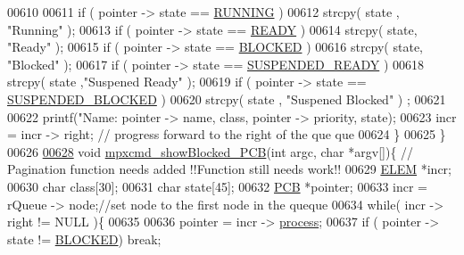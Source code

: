 \begin{DoxyCode}
{{{{00610                 
00611                 \textcolor{keywordflow}{if} ( pointer -> state == \hyperlink{mpx__r2_8h_a6fb7181d994ee98e735494be55809708}{RUNNING} ) 
00612                         strcpy( state , \textcolor{stringliteral}{"Running"} );
00613                 \textcolor{keywordflow}{if} ( pointer -> state == \hyperlink{mpx__r2_8h_ad1235d5ce36f7267285e82dccd428aa6}{READY} ) 
00614                         strcpy( state, \textcolor{stringliteral}{"Ready"} );
00615                 \textcolor{keywordflow}{if} ( pointer -> state == \hyperlink{mpx__r2_8h_a48f6457243719e7031768d4100741159}{BLOCKED} ) 
00616                         strcpy( state, \textcolor{stringliteral}{"Blocked"} );
00617                 \textcolor{keywordflow}{if} ( pointer -> state == \hyperlink{mpx__r2_8h_a07b1141143e8825b04670da23fca8cc7}{SUSPENDED_READY} ) 
00618                         strcpy( state ,\textcolor{stringliteral}{"Suspened Ready"} );
00619                 \textcolor{keywordflow}{if} ( pointer -> state == \hyperlink{mpx__r2_8h_a6e41bb5a80c5049e8d364bab8ee4d73a}{SUSPENDED_BLOCKED} ) 
00620                         strcpy( state , \textcolor{stringliteral}{"Suspened Blocked"} ) ;
00621                 
00622                 printf(\textcolor{stringliteral}{"Name: %
      pointer -> name, \textcolor{keyword}{class}, pointer -> priority, state); 
00623                 incr = incr -> right; \textcolor{comment}{// progress forward to the right of the que
      que}
00624         \}
00625 \}
00626 
\hypertarget{mpx__r2_8c_source_l00628}{}\hyperlink{mpx__r2_8h_ae1ef92a5e3a8869ec269a23b3b854c9b}{00628} \textcolor{keywordtype}{void} \hyperlink{mpx__r2_8c_ae1ef92a5e3a8869ec269a23b3b854c9b}{mpxcmd_showBlocked_PCB}(\textcolor{keywordtype}{int} argc, \textcolor{keywordtype}{char} *argv[])\{ \textcolor{comment}{// Pagination function needs
       added !!Function still needs work!!}
00629         \hyperlink{structpage}{ELEM} *incr;
00630         \textcolor{keywordtype}{char} \textcolor{keyword}{class}[30];
00631         \textcolor{keywordtype}{char} state[45];
00632         \hyperlink{structprocess}{PCB} *pointer;
00633         incr = rQueue -> node;\textcolor{comment}{//set node to the first node in the queque}
00634         \textcolor{keywordflow}{while}( incr -> right != NULL )\{
00635                 
00636                 pointer = incr -> \hyperlink{structprocess}{process};
00637                 \textcolor{keywordflow}{if} ( pointer -> state != \hyperlink{mpx__r2_8h_a48f6457243719e7031768d4100741159}{BLOCKED}) \textcolor{keywordflow}{break};
}}}}}
\end{DoxyCode}
